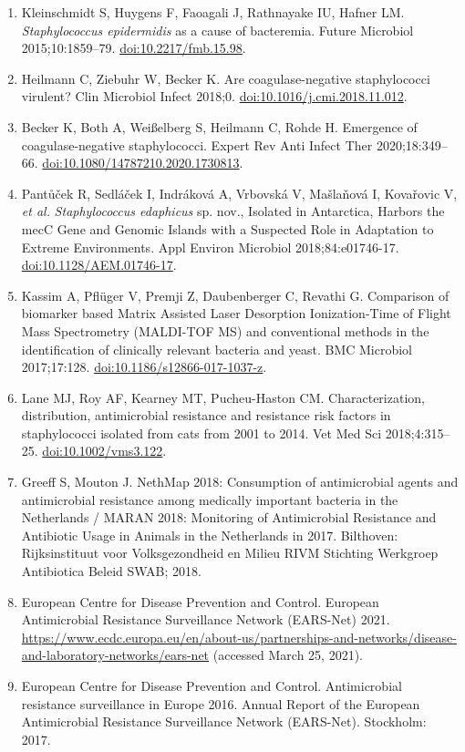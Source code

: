 \documentclass[
]{book}
\begin{document}
\begin{enumerate}
\item
  Kleinschmidt S, Huygens F, Faoagali J, Rathnayake IU, Hafner LM. \emph{Staphylococcus epidermidis} as a cause of bacteremia. Future Microbiol 2015;10:1859--79. \url{doi:10.2217/fmb.15.98}.
\item
  Heilmann C, Ziebuhr W, Becker K. Are coagulase-negative staphylococci virulent? Clin Microbiol Infect 2018;0. \url{doi:10.1016/j.cmi.2018.11.012}.
\item
  Becker K, Both A, Weißelberg S, Heilmann C, Rohde H. Emergence of coagulase-negative staphylococci. Expert Rev Anti Infect Ther 2020;18:349--66. \url{doi:10.1080/14787210.2020.1730813}.
\item
  Pantůček R, Sedláček I, Indráková A, Vrbovská V, Mašlaňová I, Kovařovic V, \emph{et al.} \emph{Staphylococcus edaphicus} sp. nov., Isolated in Antarctica, Harbors the mecC Gene and Genomic Islands with a Suspected Role in Adaptation to Extreme Environments. Appl Environ Microbiol 2018;84:e01746-17. \url{doi:10.1128/AEM.01746-17}.
\item
  Kassim A, Pflüger V, Premji Z, Daubenberger C, Revathi G. Comparison of biomarker based Matrix Assisted Laser Desorption Ionization-Time of Flight Mass Spectrometry (MALDI-TOF MS) and conventional methods in the identification of clinically relevant bacteria and yeast. BMC Microbiol 2017;17:128. \url{doi:10.1186/s12866-017-1037-z}.
\item
  Lane MJ, Roy AF, Kearney MT, Pucheu-Haston CM. Characterization, distribution, antimicrobial resistance and resistance risk factors in staphylococci isolated from cats from 2001 to 2014. Vet Med Sci 2018;4:315--25. \url{doi:10.1002/vms3.122}.
\item
  Greeff S, Mouton J. NethMap 2018: Consumption of antimicrobial agents and antimicrobial resistance among medically important bacteria in the Netherlands / MARAN 2018: Monitoring of Antimicrobial Resistance and Antibiotic Usage in Animals in the Netherlands in 2017. Bilthoven: Rijksinstituut voor Volksgezondheid en Milieu RIVM Stichting Werkgroep Antibiotica Beleid SWAB; 2018.
\item
  European Centre for Disease Prevention and Control. European Antimicrobial Resistance Surveillance Network (EARS-Net) 2021. \url{https://www.ecdc.europa.eu/en/about-us/partnerships-and-networks/disease-and-laboratory-networks/ears-net} (accessed March 25, 2021).
\item
  European Centre for Disease Prevention and Control. Antimicrobial resistance surveillance in Europe 2016. Annual Report of the European Antimicrobial Resistance Surveillance Network (EARS-Net). Stockholm: 2017.

\end{enumerate}
\end{document}
